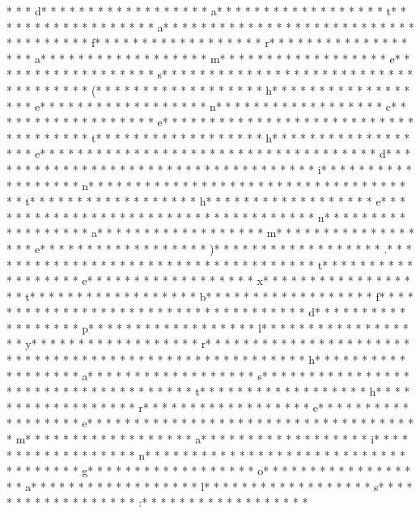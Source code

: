 * *  * d* * *  * * *  * * *  *  * * *  *  * * *  * a* * *  * * *  * * *  *  * * *  *  * * *  * t* * *  * * *  * * *  *  * * *  *  * * *  * a* * *  * * *  * * *  *  * * *  *  * * *  *  * * *  * * *  * * *  *  * * *  *  * * *  * f* * *  * * *  * * *  *  * * *  *  * * *  * r* * *  * * *  * * *  *  * * *  *  * * *  * a* * *  * * *  * * *  *  * * *  *  * * *  * m* * *  * * *  * * *  *  * * *  *  * * *  * e* * *  * * *  * * *  *  * * *  *  * * *  * s* * *  * * *  * * *  *  * * *  *  * * *  *  * * *  * * *  * * *  *  * * *  *  * * *  * (* * *  * * *  * * *  *  * * *  *  * * *  * h* * *  * * *  * * *  *  * * *  *  * * *  * e* * *  * * *  * * *  *  * * *  *  * * *  * n* * *  * * *  * * *  *  * * *  *  * * *  * c* * *  * * *  * * *  *  * * *  *  * * *  * e* * *  * * *  * * *  *  * * *  *  * * *  *  * * *  * * *  * * *  *  * * *  *  * * *  * t* * *  * * *  * * *  *  * * *  *  * * *  * h* * *  * * *  * * *  *  * * *  *  * * *  * e* * *  * * *  * * *  *  * * *  *  * * *  *  * * *  * * *  * * *  *  * * *  *  * * *  * d* * *  * * *  * * *  *  * * *  *  * * *  *  * * *  * * *  * * *  *  * * *  *  * * *  * i* * *  * * *  * * *  *  * * *  *  * * *  * n* * *  * * *  * * *  *  * * *  *  * * *  *  * * *  * * *  * * *  *  * * *  *  * * *  * t* * *  * * *  * * *  *  * * *  *  * * *  * h* * *  * * *  * * *  *  * * *  *  * * *  * e* * *  * * *  * * *  *  * * *  *  * * *  *  * * *  * * *  * * *  *  * * *  *  * * *  * n* * *  * * *  * * *  *  * * *  *  * * *  * a* * *  * * *  * * *  *  * * *  *  * * *  * m* * *  * * *  * * *  *  * * *  *  * * *  * e* * *  * * *  * * *  *  * * *  *  * * *  * )* * *  * * *  * * *  *  * * *  *  * * *  * .* * *  * * *  * * *  *  * * *  *  * * *  *  * * *  * * *  * * *  *  * * *  *  * * *  * t* * *  * * *  * * *  *  * * *  *  * * *  * e* * *  * * *  * * *  *  * * *  *  * * *  * x* * *  * * *  * * *  *  * * *  *  * * *  * t* * *  * * *  * * *  *  * * *  *  * * *  * b* * *  * * *  * * *  *  * * *  *  * * *  * f* * *  * * *  * * *  *  * * *  *  * * *  * {* * *  * * *  * * *  *  * * *  *  * * *  * d* * *  * * *  * * *  *  * * *  *  * * *  * p* * *  * * *  * * *  *  * * *  *  * * *  * l* * *  * * *  * * *  *  * * *  *  * * *  * y* * *  * * *  * * *  *  * * *  *  * * *  * r* * *  * * *  * * *  *  * * *  *  * * *  * }* * *  * * *  * * *  *  * * *  *  * * *  *  * * *  * * *  * * *  *  * * *  *  * * *  * h* * *  * * *  * * *  *  * * *  *  * * *  * a* * *  * * *  * * *  *  * * *  *  * * *  * s* * *  * * *  * * *  *  * * *  *  * * *  *  * * *  * * *  * * *  *  * * *  *  * * *  * t* * *  * * *  * * *  *  * * *  *  * * *  * h* * *  * * *  * * *  *  * * *  *  * * *  * r* * *  * * *  * * *  *  * * *  *  * * *  * e* * *  * * *  * * *  *  * * *  *  * * *  * e* * *  * * *  * * *  *  * * *  *  * * *  *  * * *  * * *  * * *  *  * * *  *  * * *  * m* * *  * * *  * * *  *  * * *  *  * * *  * a* * *  * * *  * * *  *  * * *  *  * * *  * i* * *  * * *  * * *  *  * * *  *  * * *  * n* * *  * * *  * * *  *  * * *  *  * * *  *  * * *  * * *  * * *  *  * * *  *  * * *  * g* * *  * * *  * * *  *  * * *  *  * * *  * o* * *  * * *  * * *  *  * * *  *  * * *  * a* * *  * * *  * * *  *  * * *  *  * * *  * l* * *  * * *  * * *  *  * * *  *  * * *  * s* * *  * * *  * * *  *  * * *  *  * * *  * :* * *  * * *  * * *  *  * * *  *  * * *  * 
